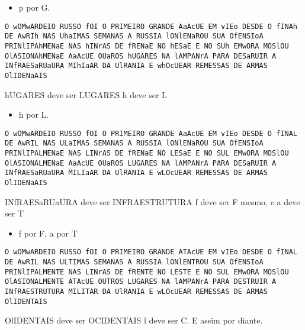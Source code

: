 \begin{frame}{}{}
\small
\begin{itemize}
\item p por G.
\end{itemize}
\texttt{O wOMwARDEIO RUSSO fOI O PRIMEIRO GRANDE AaAcUE EM vIEo DESDE O fINAh DE AwRIh NAS UhaIMAS SEMANAS A RUSSIA lONlENaROU SUA OfENSIoA PRINlIPAhMENaE NAS hINrAS DE fRENaE NO hESaE E NO SUh EMwORA MOSlOU OlASIONAhMENaE AaAcUE OUaROS hUGARES NA lAMPANrA PARA DESaRUIR A INfRAESaRUaURA MIhIaAR DA UlRANIA E whOcUEAR REMESSAS DE ARMAS OlIDENaAIS}
\begin{itemize}
\pitem hUGARES deve ser LUGARES
\pitem h deve ser L
\end{itemize}
\end{frame}

\begin{frame}{}{}
\small
\begin{itemize}
\item h por L.
\end{itemize}
\texttt{O wOMwARDEIO RUSSO fOI O PRIMEIRO GRANDE AaAcUE EM vIEo DESDE O fINAL DE AwRIL NAS ULaIMAS SEMANAS A RUSSIA lONlENaROU SUA OfENSIoA PRINlIPALMENaE NAS LINrAS DE fRENaE NO LESaE E NO SUL EMwORA MOSlOU OlASIONALMENaE AaAcUE OUaROS LUGARES NA lAMPANrA PARA DESaRUIR A INfRAESaRUaURA MILIaAR DA UlRANIA E wLOcUEAR REMESSAS DE ARMAS OlIDENaAIS}
\begin{itemize}
\pitem INfRAESaRUaURA deve ser INFRAESTRUTURA
\pitem f deve ser F mesmo, e a deve ser T
\end{itemize}
\end{frame}

\begin{frame}{}{}
\small
\begin{itemize}
\item  f por F, a por T
\end{itemize}
\texttt{O wOMwARDEIO RUSSO fOI O PRIMEIRO GRANDE ATAcUE EM vIEo DESDE O fINAL DE AwRIL NAS ULTIMAS SEMANAS A RUSSIA lONlENTROU SUA OfENSIoA PRINlIPALMENTE NAS LINrAS DE fRENTE NO LESTE E NO SUL EMwORA MOSlOU OlASIONALMENTE ATAcUE OUTROS LUGARES NA lAMPANrA PARA DESTRUIR A INfRAESTRUTURA MILITAR DA UlRANIA E wLOcUEAR REMESSAS DE ARMAS OlIDENTAIS}
\begin{itemize}
\pitem OlIDENTAIS deve ser OCIDENTAIS
\pitem l deve ser C. E assim por diante.
\end{itemize}
\end{frame}


